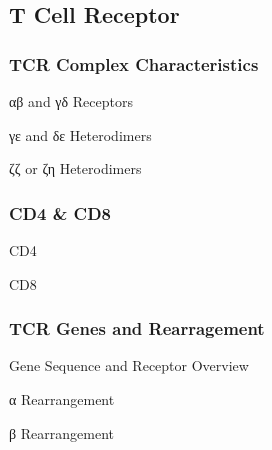 \documentclass[10pt]{article}
\begin{document}
  \subsection{T Cell Receptor}

    \subsubsection{TCR Complex Characteristics}

      \begin{core}{αβ and γδ Receptors}

      \end{core}

      \begin{core}{γε and δε Heterodimers}

      \end{core}

      \begin{core}{ζζ or ζη Heterodimers}

      \end{core}

    \subsubsection{CD4 \& CD8}

      \begin{core}{CD4}

      \end{core}

      \begin{core}{CD8}

      \end{core}

    \subsubsection{TCR Genes and Rearragement}

      \begin{core}{Gene Sequence and Receptor Overview}

      \end{core}

      \begin{core}{α Rearrangement}

      \end{core}

      \begin{core}{β Rearrangement}

      \end{core}
\end{document}

